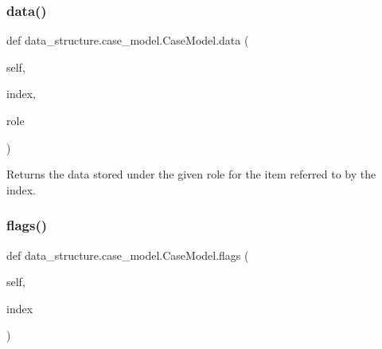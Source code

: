 \hypertarget{classdata__structure_1_1case__model_1_1_case_model_a2f7291849d0efb3d7cff499d1cde0bf6}{}\label{classdata__structure_1_1case__model_1_1_case_model_a2f7291849d0efb3d7cff499d1cde0bf6} 
\subsubsection{\texorpdfstring{data()}{data()}}
{\footnotesize\ttfamily def data\+\_\+structure.\+case\+\_\+model.\+Case\+Model.\+data (\begin{DoxyParamCaption}\item[{}]{self,  }\item[{}]{index,  }\item[{}]{role }\end{DoxyParamCaption})}



Returns the data stored under the given role for the item referred to by the index. 

\hypertarget{classdata__structure_1_1case__model_1_1_case_model_ad60d9395ff571be3fcf12411886f8bcf}{}\label{classdata__structure_1_1case__model_1_1_case_model_ad60d9395ff571be3fcf12411886f8bcf} 
\subsubsection{\texorpdfstring{flags()}{flags()}}
{\footnotesize\ttfamily def data\+\_\+structure.\+case\+\_\+model.\+Case\+Model.\+flags (\begin{DoxyParamCaption}\item[{}]{self,  }\item[{}]{index }\end{DoxyParamCaption})}

\hypertarget{classdata__structure_1_1case__model_1_1_case_model_ad19222ac3eb114c51dce157ae50b2e19}{}\label{classdata__structure_1_1case__model_1_1_case_model_ad19222ac3eb114c51dce157ae50b2e19} 
